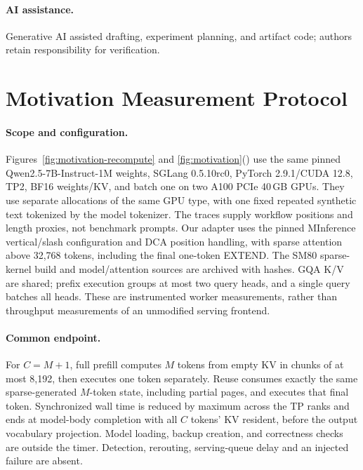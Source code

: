 \documentclass[sigplan,10pt,anonymous,nonacm]{acmart}
\begin{document}
\paragraph{AI assistance.}
Generative AI assisted drafting, experiment planning, and artifact code;
authors retain responsibility for verification.




\appendix
\section{Motivation Measurement Protocol}
\label{sec:motivation-protocol}

\paragraph{Scope and configuration.}
Figures~\ref{fig:motivation-recompute} and
\ref{fig:motivation}() use the same pinned
Qwen2.5-7B-Instruct-1M weights, SGLang 0.5.10rc0, PyTorch 2.9.1/CUDA 12.8,
TP2, BF16 weights/KV, and batch one on two A100 PCIe 40\,GB GPUs.
They use separate allocations of the same GPU type, with one fixed
repeated synthetic text tokenized by the model tokenizer. The traces
supply workflow positions and length proxies, not benchmark prompts.
Our adapter uses the pinned MInference vertical/slash configuration and
DCA position handling, with sparse attention above 32,768 tokens,
including the final one-token EXTEND. The SM80 sparse-kernel build and
model/attention sources are archived with hashes. GQA K/V are shared;
prefix execution groups at most two query heads, and a single query
batches all heads. These are instrumented worker measurements, rather
than throughput measurements of an unmodified serving frontend.

\paragraph{Common endpoint.}
For $C=M+1$, full prefill computes $M$ tokens from empty KV in chunks of
at most 8,192, then executes one token separately. Reuse consumes exactly
the same sparse-generated $M$-token state, including partial pages, and
executes that final token. Synchronized wall time is reduced by maximum
across the TP ranks and ends at model-body completion with all $C$ tokens'
KV resident, before the output vocabulary projection. Model loading,
backup creation, and correctness checks are outside the timer. Detection,
rerouting, serving-queue delay and an injected failure are absent.
\end{document}
